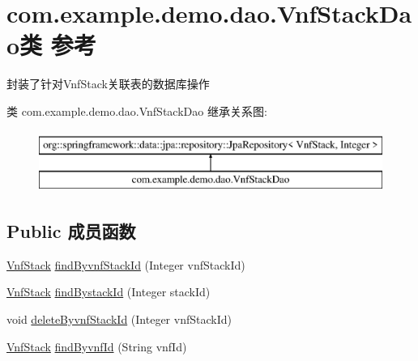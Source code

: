 \hypertarget{interfacecom_1_1example_1_1demo_1_1dao_1_1_vnf_stack_dao}{}\section{com.\+example.\+demo.\+dao.\+Vnf\+Stack\+Dao类 参考}
\label{interfacecom_1_1example_1_1demo_1_1dao_1_1_vnf_stack_dao}


封装了针对\+Vnf\+Stack关联表的数据库操作  


类 com.\+example.\+demo.\+dao.\+Vnf\+Stack\+Dao 继承关系图\+:\begin{figure}[H]
\begin{center}
\leavevmode
\includegraphics[height=2.000000cm]{interfacecom_1_1example_1_1demo_1_1dao_1_1_vnf_stack_dao}
\end{center}
\end{figure}
\subsection*{Public 成员函数}
\begin{DoxyCompactItemize}
\item 
\mbox{\hyperlink{classcom_1_1example_1_1demo_1_1modular_1_1_vnf_stack}{Vnf\+Stack}} \mbox{\hyperlink{interfacecom_1_1example_1_1demo_1_1dao_1_1_vnf_stack_dao_aad5b56c93516fbcf0a29343634594949}{find\+Byvnf\+Stack\+Id}} (Integer vnf\+Stack\+Id)
\item 
\mbox{\hyperlink{classcom_1_1example_1_1demo_1_1modular_1_1_vnf_stack}{Vnf\+Stack}} \mbox{\hyperlink{interfacecom_1_1example_1_1demo_1_1dao_1_1_vnf_stack_dao_a0b37abfcb38bf3e6e1b910b23a8208d1}{find\+Bystack\+Id}} (Integer stack\+Id)
\item 
void \mbox{\hyperlink{interfacecom_1_1example_1_1demo_1_1dao_1_1_vnf_stack_dao_aca994714a4c9a32f07d79d5bbc927dc2}{delete\+Byvnf\+Stack\+Id}} (Integer vnf\+Stack\+Id)
\item 
\mbox{\hyperlink{classcom_1_1example_1_1demo_1_1modular_1_1_vnf_stack}{Vnf\+Stack}} \mbox{\hyperlink{interfacecom_1_1example_1_1demo_1_1dao_1_1_vnf_stack_dao_aa337cbbfe5b310b0330aa79c1eecc9e3}{find\+Byvnf\+Id}} (String vnf\+Id)
\end{DoxyCompactItemize}


